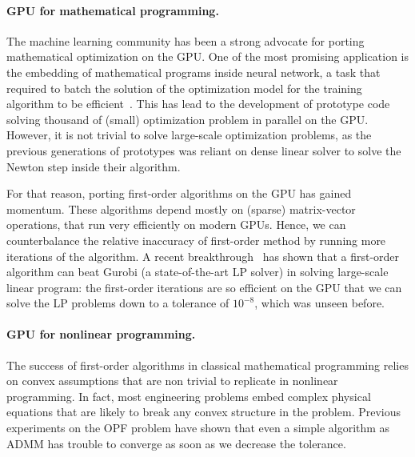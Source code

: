 \paragraph{GPU for mathematical programming.}
The machine learning community has been a strong advocate
for porting mathematical optimization on the GPU. One of the most
promising application is the embedding of mathematical programs
inside neural network, a task that required to batch the solution
of the optimization model for the training algorithm to be efficient~\cite{amos2017optnet,pineda2022theseus}.
This has lead to the development of prototype code solving
thousand of (small) optimization problem in parallel on the GPU.
However, it is not trivial to solve large-scale optimization problems,
as the previous generations of prototypes was reliant on dense linear solver
to solve the Newton step inside their algorithm.

For that reason, porting first-order algorithms on the GPU
has gained momentum.
These algorithms depend mostly on (sparse) matrix-vector operations, that run
very efficiently on modern GPUs. Hence, we can counterbalance
the relative inaccuracy of first-order method by running more
iterations of the algorithm.
A recent breakthrough~\cite{lu2023cupdlp,lu2023cupdlp2} has shown that a first-order algorithm
can beat Gurobi (a state-of-the-art LP solver) in solving large-scale linear program:
the first-order iterations are so efficient on the GPU that we can solve the
LP problems down to a tolerance of $10^{-8}$, which was unseen before.


\paragraph{GPU for nonlinear programming.}
The success of first-order algorithms in classical mathematical programming
relies on convex assumptions that are non trivial to replicate
in nonlinear programming. In fact, most engineering problems embed complex
physical equations that are likely to break any convex structure in  the problem.
Previous experiments on the OPF problem have shown that even a simple
algorithm as ADMM has trouble to converge as soon as we decrease the
tolerance.

